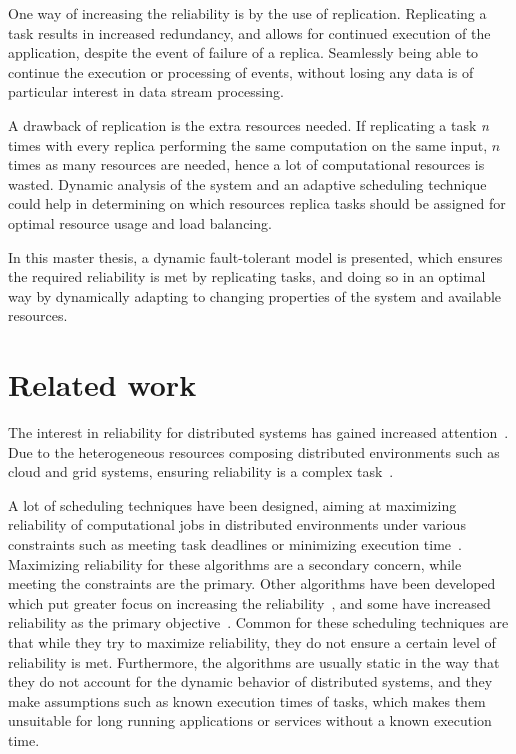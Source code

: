 \documentclass{cslthse-msc}
\begin{document}
One way of increasing the reliability is by the use of replication. Replicating a task results in increased redundancy, and allows for continued execution of the application, despite the event of failure of a replica. Seamlessly being able to continue the execution or processing of events, without losing any data is of particular interest in data stream processing.

A drawback of replication is the extra resources needed. If replicating a task \emph{n} times with every replica performing the same computation on the same input, $n$ times as many resources are needed, hence a lot of computational resources is wasted. Dynamic analysis of the system and an adaptive scheduling technique could help in determining on which resources replica tasks should be assigned for optimal resource usage and load balancing.

In this master thesis, a dynamic fault-tolerant model is presented, which ensures the required reliability is met by replicating tasks, and doing so in an optimal way by dynamically adapting to changing properties of the system and available resources.

\section{Related work} \label{sec:introduction_related_work}
The interest in reliability for distributed systems has gained increased attention~\cite{replicationManagement}. Due to the heterogeneous resources composing distributed environments such as cloud and grid systems, ensuring reliability is a complex task~\cite{cloudServiceRel, surveyReliabilityDistr}.

A lot of scheduling techniques have been designed, aiming at maximizing reliability of computational jobs in distributed environments under various constraints such as meeting task deadlines or minimizing execution time~\cite{algoOptTimeMaxRel, optTaskAllocationForMaxRel, taskAllocation, taskAllocationSwarm, algoMaxRelEndToEndConstraint, algoMinExTime, schedReplicas}. Maximizing reliability for these algorithms are a secondary concern, while meeting the constraints are the primary. Other algorithms have been developed which put greater focus on increasing the reliability~\cite{optResourceAllMaxPerformance, matchSchedAlgoMinFailure}, and some have increased reliability as the primary objective~\cite{safetyRelTaskAllocation, improvedTaskAllMaxRel}. Common for these scheduling techniques are that while they try to maximize reliability, they do not ensure a certain level of reliability is met. Furthermore, the algorithms are usually static in the way that they do not account for the dynamic behavior of distributed systems, and they make assumptions such as known execution times of tasks, which makes them unsuitable for long running applications or services without a known execution time.
\end{document}
